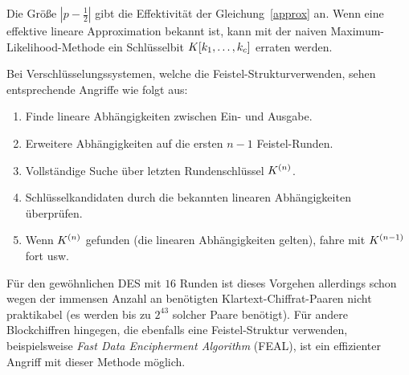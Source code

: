 Die Größe $\left|{p-\frac{1}{2}}\right|$ gibt die Effektivität der Gleichung~\ref{approx} an. Wenn eine effektive lineare Approximation bekannt ist, kann mit der naiven Maximum-Likelihood-Methode ein Schlüsselbit $K[k_1,\dots, k_c]$ erraten werden. %

Bei Verschlüsselungssystemen, welche die Feistel-Struktur\indexFeistel verwenden, sehen entsprechende Angriffe wie folgt aus:
\begin{enumerate}
	\item Finde lineare Abhängigkeiten zwischen Ein- und Ausgabe.
	\item Erweitere Abhängigkeiten auf die ersten $n-1$ Feistel-Runden.
	\item Vollständige Suche über letzten Rundenschlüssel $K^{(n)}$.
	\item Schlüsselkandidaten durch die bekannten linearen Abhängigkeiten überprüfen.
	\item Wenn $K^{(n)}$ gefunden (\dh die linearen Abhängigkeiten gelten), fahre mit $K^{(n-1)}$ fort usw.
\end{enumerate}

Für den gewöhnlichen DES mit $16$ Runden ist dieses Vorgehen allerdings schon wegen der immensen Anzahl an benötigten Klartext-Chiffrat-Paaren nicht praktikabel (es werden bis zu $2^{43}$ solcher Paare benötigt). Für andere Blockchiffren hingegen, die ebenfalls eine Feistel-Struktur verwenden, beispielsweise \emph{Fast Data Encipherment Algorithm} (FEAL), ist ein effizienter Angriff mit dieser Methode möglich.

